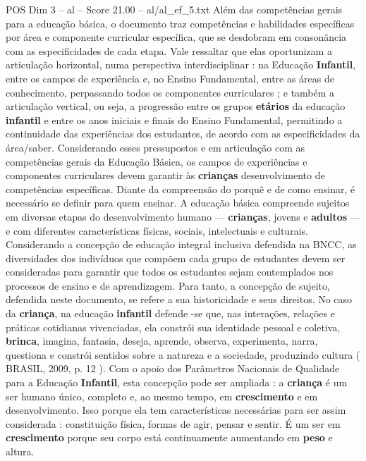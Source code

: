 \begin{textsample}{POS Dim 3 – al – Score 21.00 – al/al\_ef\_5.txt}  \label{ex:f3_pos_214}
Além das competências gerais para a educação básica, o documento traz competências e habilidades específicas por área e componente curricular específica, que se desdobram em consonância com as especificidades de cada etapa.
Vale ressaltar que elas oportunizam a articulação horizontal, numa perspectiva interdisciplinar : na Educação \textbf{Infantil}, entre os campos de experiência e, no Ensino Fundamental, entre as áreas de conhecimento, perpassando todos os componentes curriculares ; e também a articulação vertical, ou seja, a progressão entre os grupos \textbf{etários} da educação \textbf{infantil} e entre os anos iniciais e finais do Ensino Fundamental, permitindo a continuidade das experiências dos estudantes, de acordo com as especificidades da área/saber.
Considerando esses pressupostos e em articulação com as competências gerais da Educação Básica, os campos de experiências e componentes curriculares devem garantir às \textbf{crianças} desenvolvimento de competências específicas.
Diante da compreensão do porquê e de como ensinar, é necessário se definir para quem ensinar.
A educação básica compreende sujeitos em diversas etapas do desenvolvimento humano — \textbf{crianças}, jovens e \textbf{adultos} — e com diferentes características físicas, sociais, intelectuais e culturais.
Considerando a concepção de educação integral inclusiva defendida na BNCC, as diversidades dos indivíduos que compõem cada grupo de estudantes devem ser consideradas para garantir que todos os estudantes sejam contemplados nos processos de ensino e de aprendizagem.
Para tanto, a concepção de sujeito, defendida neste documento, se refere a sua historicidade e seus direitos.
No caso da \textbf{criança}, na educação \textbf{infantil} defende -se que, nas interações, relações e práticas cotidianas vivenciadas, ela constrói sua identidade pessoal e coletiva, \textbf{brinca}, imagina, fantasia, deseja, aprende, observa, experimenta, narra, questiona e constrói sentidos sobre a natureza e a sociedade, produzindo cultura ( BRASIL, 2009, p. 12 ).
Com o apoio dos Parâmetros Nacionais de Qualidade para a Educação \textbf{Infantil}, esta concepção pode ser ampliada : a \textbf{criança} é um ser humano único, completo e, ao mesmo tempo, em \textbf{crescimento} e em desenvolvimento.
Isso porque ela tem características necessárias para ser assim considerada : constituição física, formas de agir, pensar e sentir.
É um ser em \textbf{crescimento} porque seu corpo está continuamente aumentando em \textbf{peso} e altura.

\end{textsample}
